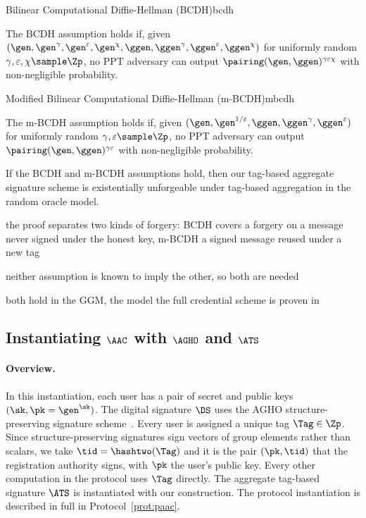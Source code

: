   \begin{assumptionbox}{Bilinear Computational Diffie-Hellman (BCDH)}{bcdh}

    The BCDH assumption holds if, given $(\gen, \gen^\gamma, \gen^\varepsilon,
\gen^\chi, \ggen, \ggen^\gamma, \ggen^\varepsilon, \ggen^\chi)$ for uniformly
random $\gamma, \varepsilon, \chi \sample \Zp$, no PPT adversary can output
$\pairing(\gen, \ggen)^{\gamma\varepsilon\chi}$ with non-negligible probability.

  \end{assumptionbox}

  \begin{assumptionbox}{Modified Bilinear Computational Diffie-Hellman
(m-BCDH)}{mbcdh}

    The m-BCDH assumption holds if, given $(\gen, \gen^{1/\varepsilon}, \ggen,
\ggen^\gamma, \ggen^\varepsilon)$ for uniformly random $\gamma, \varepsilon
\sample \Zp$, no PPT adversary can output $\pairing(\gen,
\ggen)^{\gamma\varepsilon}$ with non-negligible probability.

  \end{assumptionbox}

  \begin{theorem}\label{thm:agg-creds-thm-1} If the BCDH and m-BCDH assumptions
hold, then our tag-based aggregate signature scheme is existentially unforgeable
under tag-based aggregation in the random oracle model.  \end{theorem}

\begin{outline}
  \item the proof separates two kinds of forgery: BCDH covers a forgery on a message never signed under the honest key, m-BCDH a signed message reused under a new tag
  \item neither assumption is known to imply the other, so both are needed
  \item both hold in the GGM, the model the full credential scheme is proven in
\end{outline}

\subsection{Instantiating $\AAC$ with $\AGHO$ and $\ATS$}\label{sec:agg-creds-aac-inst}

\paragraph{Overview.} In this instantiation, each user has a pair of secret and public keys $(\sk, \pk
= \gen^\sk)$. The digital signature $\DS$ uses the AGHO
structure-preserving signature scheme~\cite{C:AGHO11}. Every user is assigned a
unique tag $\Tag \in \Zp$. Since structure-preserving signatures sign vectors
of group elements rather than scalars, we take $\tid = \hashtwo(\Tag)$ and it is
the pair $(\pk, \tid)$ that the registration authority signs, with $\pk$ the
user's public key.  Every other computation in the protocol uses $\Tag$
directly. The aggregate tag-based signature $\ATS$ is instantiated with our
construction. The protocol instantiation is described in full in
Protocol~\ref{prot:paac}.

